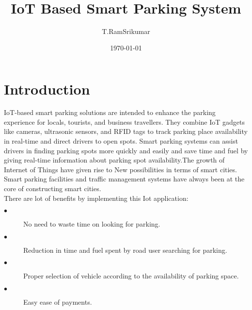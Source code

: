 \documentclass[12pt]{article}
\begin{document}
\title{\Huge IoT Based Smart Parking System}
\author{T.RamSrikumar}
\date{\today}
\maketitle







\section{Introduction}
	 
    IoT-based smart parking solutions are intended to enhance the parking experience for locals, tourists, and business travellers. They combine IoT gadgets like cameras, ultrasonic sensors, and RFID tags to track parking place availability in real-time and direct drivers to open spots. Smart parking systems can assist drivers in finding parking spots more quickly and easily and save time and fuel by giving real-time information about parking spot availability.The growth of Internet of Things have given rise to New
    possibilities in terms of smart cities. Smart parking facilities
    and traffic management systems have always been at the core 
    of constructing smart cities.\\
    
    There are lot of benefits by implementing this Iot application:
\begin{description}
  \item[$\bullet$] No need to waste time on looking for parking.
  \item[$\bullet$] Reduction in time and fuel spent by road user 
searching for parking.
  \item[$\bullet$] Proper selection of vehicle according to the 
availability of parking space.
  \item[$\bullet$] Easy ease of payments.
\end{description}
    
    
\end{document}
